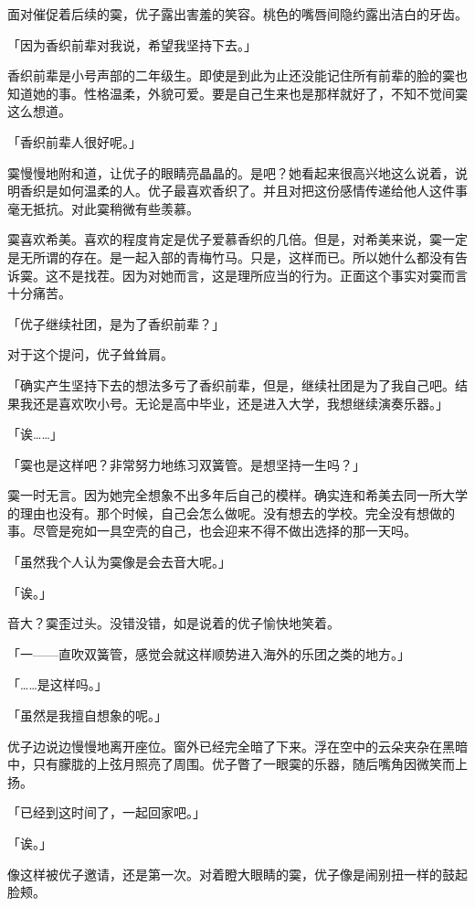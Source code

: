\documentclass[UTF8]{ctexart}
\begin{document}
    面对催促着后续的霙，优子露出害羞的笑容。桃色的嘴唇间隐约露出洁白的牙齿。

    「因为香织前辈对我说，希望我坚持下去。」

    香织前辈是小号声部的二年级生。即使是到此为止还没能记住所有前辈的脸的霙也知道她的事。性格温柔，外貌可爱。要是自己生来也是那样就好了，不知不觉间霙这么想道。

    「香织前辈人很好呢。」

    霙慢慢地附和道，让优子的眼睛亮晶晶的。是吧？她看起来很高兴地这么说着，说明香织是如何温柔的人。优子最喜欢香织了。并且对把这份感情传递给他人这件事毫无抵抗。对此霙稍微有些羡慕。

    霙喜欢希美。喜欢的程度肯定是优子爱慕香织的几倍。但是，对希美来说，霙一定是无所谓的存在。是一起入部的青梅竹马。只是，这样而已。所以她什么都没有告诉霙。这不是找茬。因为对她而言，这是理所应当的行为。正面这个事实对霙而言十分痛苦。

    「优子继续社团，是为了香织前辈？」

    对于这个提问，优子耸耸肩。

    「确实产生坚持下去的想法多亏了香织前辈，但是，继续社团是为了我自己吧。结果我还是喜欢吹小号。无论是高中毕业，还是进入大学，我想继续演奏乐器。」

    「诶……」

    「霙也是这样吧？非常努力地练习双簧管。是想坚持一生吗？」

    霙一时无言。因为她完全想象不出多年后自己的模样。确实连和希美去同一所大学的理由也没有。那个时候，自己会怎么做呢。没有想去的学校。完全没有想做的事。尽管是宛如一具空壳的自己，也会迎来不得不做出选择的那一天吗。

    「虽然我个人认为霙像是会去音大呢。」

    「诶。」

    音大？霙歪过头。没错没错，如是说着的优子愉快地笑着。

    「一——直吹双簧管，感觉会就这样顺势进入海外的乐团之类的地方。」

    「……是这样吗。」

    「虽然是我擅自想象的呢。」

    优子边说边慢慢地离开座位。窗外已经完全暗了下来。浮在空中的云朵夹杂在黑暗中，只有朦胧的上弦月照亮了周围。优子瞥了一眼霙的乐器，随后嘴角因微笑而上扬。

    「已经到这时间了，一起回家吧。」

    「诶。」

    像这样被优子邀请，还是第一次。对着瞪大眼睛的霙，优子像是闹别扭一样的鼓起脸颊。
\end{document}
